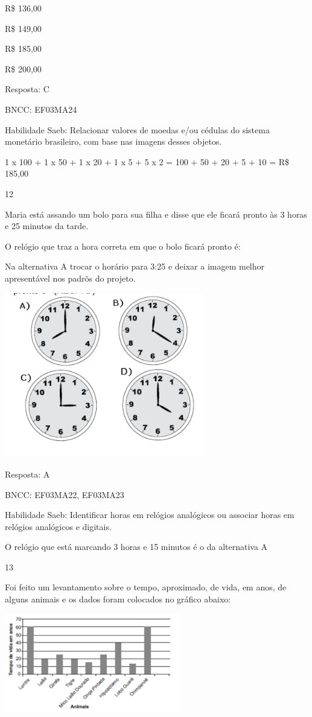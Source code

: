 \begin{escolha}
\begin{escolha}
\item
  R\$ 136,00
\item
  R\$ 149,00
\item
  R\$ 185,00
\item
  R\$ 200,00
\end{escolha}

Resposta: C

BNCC: EF03MA24

Habilidade Saeb: Relacionar valores de moedas e/ou cédulas do sistema
monetário brasileiro, com base nas imagens desses objetos.

1 x 100 + 1 x 50 + 1 x 20 + 1 x 5 + 5 x 2 = 100 + 50 + 20 + 5 + 10 = R\$
185,00

\num{12}

Maria está assando um bolo para sua filha e disse que ele ficará pronto
às 3 horas e 25 minutos da tarde.

O relógio que traz a hora correta em que o bolo ficará pronto é:

Na alternativa A trocar o horário para 3:25 e deixar a imagem melhor
apresentável nos padrõs do projeto.

\includegraphics[width=3.44197in,height=2.84191in]{media/image126.png}

Resposta: A

BNCC: EF03MA22, EF03MA23

Habilidade Saeb: Identificar horas em relógios analógicos ou associar
horas em relógios analógicos e digitais.

O relógio que está marcando 3 horas e 15 minutos é o da alternativa A

\num{13}

Foi feito um levantamento sobre o tempo, aproximado, de vida, em anos,
de alguns animais e os dados foram colocados no gráfico abaixo:

\includegraphics[width=3.02451in,height=1.70004in]{media/image127.png}


\end{escolha}
